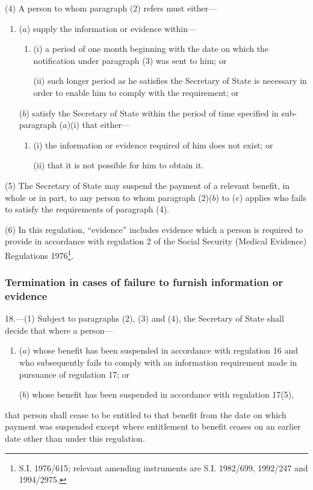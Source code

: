 \documentclass[12pt,a4paper]{article}
\begin{document}
(4) A person to whom paragraph (2) refers must either—
\begin{enumerate}\item[]
($a$) supply the information or evidence within—
\begin{enumerate}\item[]
(i) a period of one month beginning with the date on which the notification under paragraph (3) was sent to him; or

(ii) such longer period as he satisfies the Secretary of State is necessary in order to enable him to comply with the requirement; or
\end{enumerate}

($b$) satisfy the Secretary of State within the period of time specified in sub-paragraph ($a$)(i) that either—
\begin{enumerate}\item[]
(i) the information or evidence required of him does not exist; or

(ii) that it is not possible for him to obtain it.
\end{enumerate}
\end{enumerate}

(5) The Secretary of State may suspend the payment of a relevant benefit, in whole or in part, to any person to whom paragraph (2)($b$) to ($e$) applies who fails to satisfy the requirements of paragraph (4).

(6) In this regulation, “evidence” includes evidence which a person is required to provide in accordance with regulation 2 of the Social Security (Medical Evidence) Regulations 1976\footnote{\frenchspacing S.I. 1976/615; relevant amending instruments are S.I. 1982/699, 1992/247 and 1994/2975.}.

\subsubsection[18. Termination in cases of failure to furnish information or evidence]{Termination in cases of failure to furnish information or evidence}

18.—(1) Subject to paragraphs (2), (3) and (4), the Secretary of State shall decide that where a person—
\begin{enumerate}\item[]
($a$) whose benefit has been suspended in accordance with regulation 16 and who subsequently fails to comply with an information requirement made in pursuance of regulation 17; or

($b$) whose benefit has been suspended in accordance with regulation 17(5),
\end{enumerate}
that person shall cease to be entitled to that benefit from the date on which payment was suspended except where entitlement to benefit ceases on an earlier date other than under this regulation.
\end{document}
